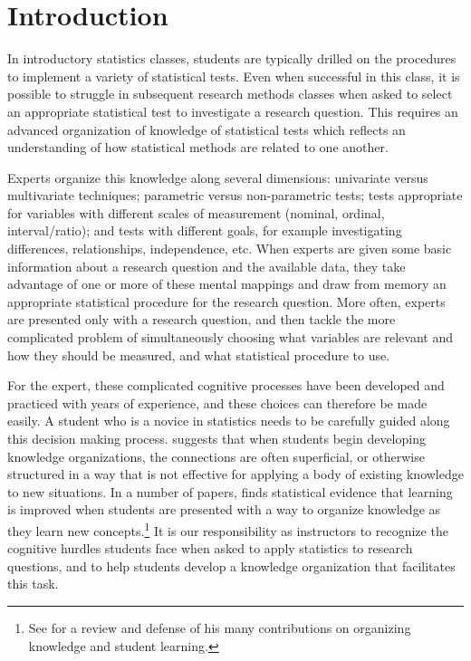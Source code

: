 \documentclass[12pt]{article}
\begin{document}
\section{Introduction}

In introductory statistics classes, students are typically drilled on the procedures to implement a variety of statistical tests.  Even when successful in this class, it is possible to struggle in subsequent research methods classes when asked to select an appropriate statistical test to investigate a research question.  This requires an advanced organization of knowledge of statistical tests which reflects an understanding of how statistical methods are related to one another.  

Experts organize this knowledge along several dimensions: univariate versus multivariate techniques; parametric versus non-parametric tests; tests appropriate for variables with different scales of measurement (nominal, ordinal, interval/ratio); and tests with different goals, for example investigating differences, relationships, independence, etc.  When experts are given some basic information about a research question and the available data, they take advantage of one or more of these mental mappings and draw from memory an appropriate statistical procedure for the research question.  More often, experts are presented only with a research question, and then tackle the more complicated problem of simultaneously choosing what variables are relevant and how they should be measured, and what statistical procedure to use.  

For the expert, these complicated cognitive processes have been developed and practiced with years of experience, and these choices can therefore be made easily.  A student who is a novice in statistics needs to be carefully guided along this decision making process.  \citet{ambrosebook} suggests that when students begin developing knowledge organizations, the connections are often superficial, or otherwise structured in a way that is not effective for applying a body of existing knowledge to new situations.  In a number of papers, \citeauthor{ausubel1978} finds statistical evidence that learning is improved when students are presented with a way to organize knowledge as they learn new concepts.\footnote{See \citet*{ausubel1978} for a review and defense of his many contributions on organizing knowledge and student learning.}  It is our responsibility as instructors to recognize the cognitive hurdles students face when asked to apply statistics to research questions, and to help students develop a knowledge organization that facilitates this task.  
\end{document}
